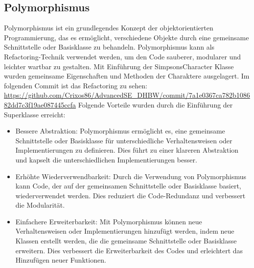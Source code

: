 \subsection{Polymorphismus}
Polymorphismus ist ein grundlegendes Konzept der objektorientierten Programmierung, das es ermöglicht, verschiedene Objekte durch eine gemeinsame Schnittstelle oder Basisklasse zu behandeln. Polymorphismus kann als Refactoring-Technik verwendet werden, um den Code sauberer, modularer und leichter wartbar zu gestalten. Mit Einführung der SimpsonsCharacter Klasse wurden gemeinsame Eigenschaften und Methoden der Charaktere ausgelagert. Im folgenden Commit ist das Refactoring zu sehen: \url{https://github.com/Crixos86/AdvancedSE_DHBW/commit/7a1e0367ca782b108682dd7c3f19ae087445ccfa} \newline
Folgende Vorteile wurden durch die Einführung der Superklasse erreicht:
\begin{itemize}
    \item Bessere Abstraktion: Polymorphismus ermöglicht es, eine gemeinsame Schnittstelle oder Basisklasse für unterschiedliche Verhaltensweisen oder Implementierungen zu definieren. Dies führt zu einer klareren Abstraktion und kapselt die unterschiedlichen Implementierungen besser.
    \item Erhöhte Wiederverwendbarkeit: Durch die Verwendung von Polymorphismus kann Code, der auf der gemeinsamen Schnittstelle oder Basisklasse basiert, wiederverwendet werden. Dies reduziert die Code-Redundanz und verbessert die Modularität.
    \item Einfachere Erweiterbarkeit: Mit Polymorphismus können neue Verhaltensweisen oder Implementierungen hinzufügt werden, indem neue Klassen erstellt werden, die die gemeinsame Schnittstelle oder Basisklasse erweitern. Dies verbessert die Erweiterbarkeit des Codes und erleichtert das Hinzufügen neuer Funktionen.
\end{itemize}